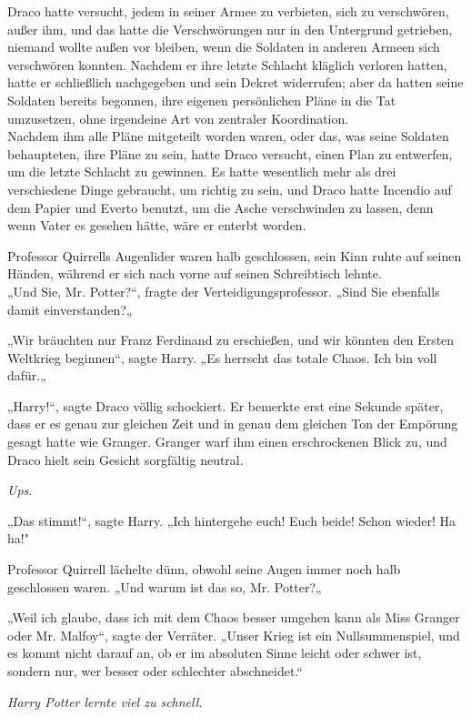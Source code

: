 {Draco hatte versucht, jedem in seiner Armee zu verbieten, sich zu verschwören, außer ihm, und das hatte die Verschwörungen nur in den Untergrund getrieben, niemand wollte außen vor bleiben, wenn die Soldaten in anderen Armeen sich verschwören konnten. Nachdem er ihre letzte Schlacht kläglich verloren hatten, hatte er schließlich nachgegeben und sein Dekret widerrufen; aber da hatten seine Soldaten bereits begonnen, ihre eigenen persönlichen Pläne in die Tat umzusetzen, ohne irgendeine Art von zentraler Koordination.\\ Nachdem ihm alle Pläne mitgeteilt worden waren, oder das, was seine Soldaten behaupteten, ihre Pläne zu sein, hatte Draco versucht, einen Plan zu entwerfen, um die letzte Schlacht zu gewinnen. Es hatte wesentlich mehr als drei verschiedene Dinge gebraucht, um richtig zu sein, und Draco hatte Incendio auf dem Papier und Everto benutzt, um die Asche verschwinden zu lassen, denn wenn Vater es gesehen hätte, wäre er enterbt worden.

Professor Quirrells Augenlider waren halb geschlossen, sein Kinn ruhte auf seinen Händen, während er sich nach vorne auf seinen Schreibtisch lehnte.\\ „Und Sie, Mr. Potter?“, fragte der Verteidigungsprofessor. „Sind Sie ebenfalls damit einverstanden?„

„Wir bräuchten nur Franz Ferdinand zu erschießen, und wir könnten den Ersten Weltkrieg beginnen“, sagte Harry. „Es herrscht das totale Chaos. Ich bin voll dafür.„

„Harry!“, sagte Draco völlig schockiert. Er bemerkte erst eine Sekunde später, dass er es genau zur gleichen Zeit und in genau dem gleichen Ton der Empörung gesagt hatte wie Granger. Granger warf ihm einen erschrockenen Blick zu, und Draco hielt sein Gesicht sorgfältig neutral.

\emph{Ups}.

„Das stimmt!“, sagte Harry. „Ich hintergehe euch! Euch beide! Schon wieder! Ha ha!"

Professor Quirrell lächelte dünn, obwohl seine Augen immer noch halb geschlossen waren. „Und warum ist das so, Mr. Potter?„

„Weil ich glaube, dass ich mit dem Chaos besser umgehen kann als Miss Granger oder Mr. Malfoy“, sagte der Verräter. „Unser Krieg ist ein Nullsummenspiel, und es kommt nicht darauf an, ob er im absoluten Sinne leicht oder schwer ist, sondern nur, wer besser oder schlechter abschneidet.“

\emph{Harry Potter lernte viel zu schnell.}

}
